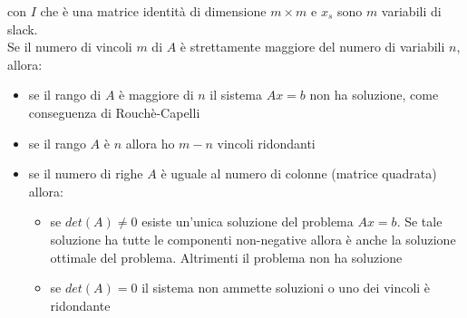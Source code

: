 \documentclass[a4paper,12pt, oneside]{book}
\begin{document}
con $I$ che è una matrice identità di dimensione $m\times m$ e $x_s$
sono $m$ variabili di slack.\\
Se il numero di vincoli $m$ di $A$ è strettamente maggiore del
numero di variabili $n$, allora:
\begin{itemize}
  \item se il rango di $A$ è maggiore di $n$ il sistema $Ax=b$ non
  ha soluzione, come conseguenza di Rouchè-Capelli
  \item se il rango $A$ è $n$ allora ho $m-n$ vincoli ridondanti
  \item se il numero di righe $A$ è uguale al numero di colonne
  (matrice quadrata) allora:
  \begin{itemize}
    \item se $det(A) \neq 0$ esiste un’unica soluzione del problema
    $Ax = b$. Se tale soluzione ha tutte le componenti non-negative
    allora è anche la soluzione ottimale del problema. Altrimenti
    il problema non ha soluzione
    \item se $det(A)=0$ il sistema non ammette soluzioni o uno dei
    vincoli è ridondante
  \end{itemize}
\end{itemize}
\end{document}
